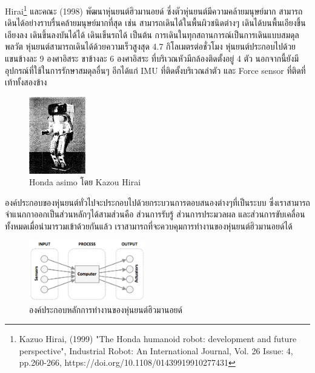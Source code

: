 Hirai\footnote{    Kazuo Hirai, (1999) "The Honda humanoid robot: development and future perspective", Industrial Robot: An International Journal, Vol. 26 Issue: 4, pp.260-266, https://doi.org/10.1108/01439919910277431} และคณะ (1998)
พัฒนาหุ่นยนต์ฮิวมานอยด์ ซึ่งตัวหุ่นยนต์มีความคล้ายมนุษย์มาก สามารถเดินได้อย่างราบรื่นคล้ายมนุษย์มากที่สุด
เช่น สามารถเดินได้ในพื้นผิวชนิดต่างๆ เดินได้บนพื้นเอียงขึ้นเอียงลง เดินขึ้นลงบันได้ได้ เดินเข็นรถได้ เป็นต้น การเดินในทุกสถานการณ์เป็นการเดินแบบสมดุลพลวัต
หุ่นยนต์สามารถเดินได้ด้วยความเร็วสูงสุด 4.7 กิโลเมตรต่อชั่วโมง หุ่นยนต์ประกอบไปด้วย แขนข้างละ 9 องศาอิสระ ขาข้างละ 6 องศาอิสระ
ที่บริเวณหัวมีกล้องติดตั้งอยู่ 4 ตัว นอกจากนี้ยังมีอุปกรณ์ที่ใช้ในการรักษาสมดุลอื่นๆ อีกได้แก่ IMU ที่ติดตั้งบริเวณลำตัว และ Force sensor ที่ติดที่เท้าทั้งสองข้าง
\begin{figure}[!ht]
    \centering
    \includegraphics[width=0.22\textwidth]{chapter2/images/honda_asimo.png}
	\caption{Honda asimo โดย Kazou Hirai}
    \label{fig:humanoid_asimo}
\end{figure}



\clearpage
องค์ประกอบของหุ่นยนต์ทั่วไปจะประกอบไปด้วยกระบวนการตอบสนองต่างๆที่เป็นระบบ
ซึ่งเราสามารถจำแนกกาออกเป็นส่วนหลักๆได้สามส่วนคือ ส่วนการรับรู้ ส่วนการประมวลผล
และส่วนการขับเคลื่อน ทั้งหมดเมื่อนำมารวมเข้าด้วยกันแล้ว เราสามารถที่จะควบคุมการทำงานของหุ่นยนต์ฮิวมานอยด์ได้

\begin{figure}[!ht]
    \centering
    \includegraphics[width=0.45\textwidth]{chapter2/images/humanoid_combine.png}
	\caption{องค์ประกอบหลักการทำงานของหุ่นยนต์ฮิวมานอยด์}
    \label{fig:humanoid_combine}
\end{figure}

